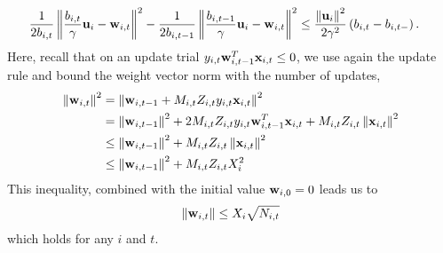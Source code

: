 {\begin{equation}
\begin{split}
\frac{1}{2b_{i,t}}\left\Vert {\frac{b_{i,t}}{\gamma} \mathbf{u}_i-\mathbf{w}_{i,t}} \right\Vert^2&-\frac{1}{2b_{i,t-1}}\left\Vert {\frac{b_{i,t-1}}{\gamma} \mathbf{u}_i-\mathbf{w}_{i,t}} \right\Vert^2
\le\frac{\left\Vert {\mathbf{u}_i} \right\Vert^2}{2\gamma^2}\left({b_{{i,t}}-b_{{i,t-}}}\right)
.
\end{split}
\label{eq:difference_of_norm_ineq}
\end{equation}
Here, recall that on an update trial $y_{i,t}\mathbf{w}_{i,t-1}^{T}\mathbf{x}_{i,t}\le0$, we use again the update rule and  bound the weight vector norm with the number of updates, 
\begin{equation*}
\begin{split}
\left\Vert {\mathbf{w}_{i,t}} \right\Vert^2&=\left\Vert {\mathbf{w}_{i,t-1}+M_{i,t}Z_{i,t}y_{i,t}\mathbf{x}_{i,t}} \right\Vert^2\\
&=\left\Vert {\mathbf{w}_{i,t-1}} \right\Vert^2+ 2M_{i,t}Z_{i,t}y_{i,t}\mathbf{w}_{i,t-1}^{T}\mathbf{x}_{i,t}+M_{i,t}Z_{i,t}\left\Vert {\mathbf{x}_{i,t}} \right\Vert^2\\
&\le\left\Vert {\mathbf{w}_{i,t-1}} \right\Vert^2+M_{i,t}Z_{i,t}\left\Vert {\mathbf{x}_{i,t}} \right\Vert^2\\
&\le\left\Vert {\mathbf{w}_{i,t-1}} \right\Vert^2+M_{i,t}Z_{i,t}X_i^2
\end{split}
\end{equation*}
This inequality, combined with the initial value $\mathbf{w}_{i,0}=0$ leads us to
\begin{equation}
\Vert\mathbf{w}_{i,t}\Vert\le X_i\sqrt{N_{i,t}}
\label{eq:bound_on_w}
\end{equation}
which holds for any $i$ and $t$. 

}
